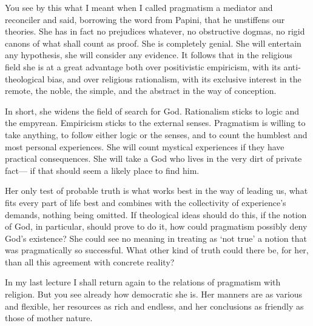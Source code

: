\documentclass[]{article}
\begin{document}
You see by this what I meant when I called pragmatism a mediator and
reconciler and said, borrowing the word from Papini, that he unstiffens
our theories. She has in fact no prejudices whatever, no obstructive
dogmas, no rigid canons of what shall count as proof. She is completely
genial. She will entertain any hypothesis, she will consider any
evidence. It follows that in the religious field she is at a great
advantage both over positivistic empiricism, with its anti-theological
bias, and over religious rationalism, with its exclusive interest in
the remote, the noble, the simple, and the abstract in the way of
conception.

In short, she widens the field of search for God. Rationalism sticks
to logic and the empyrean. Empiricism sticks to the external senses.
Pragmatism is willing to take anything, to follow either logic or the
senses, and to count the humblest and most personal experiences. She
will count mystical experiences if they have practical consequences.
She will take a God who lives in the very dirt of private fact--- if that
should seem a likely place to find him.

Her only test of probable truth is what works best in the way of leading
us, what fits every part of life best and combines with the collectivity
of experience's demands, nothing being omitted. If theological ideas
should do this, if the notion of God, in particular, should prove to do
it, how could pragmatism possibly deny God's existence? She could see
no meaning in treating as `not true' a notion that was pragmatically so
successful. What other kind of truth could there be, for her, than all
this agreement with concrete reality?

In my last lecture I shall return again to the relations of pragmatism
with religion. But you see already how democratic she is. Her manners
are as various and flexible, her resources as rich and endless, and her
conclusions as friendly as those of mother nature.
\end{document}
